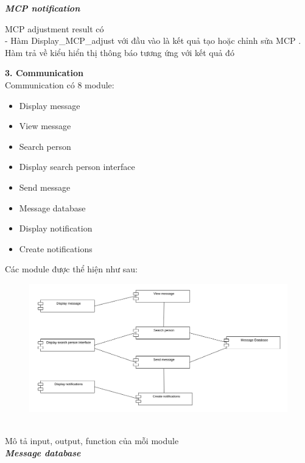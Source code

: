 \documentclass[a4paper]{article}
\begin{document}
\begin{itemize}
\newline
\newline
\textbf{    \textit{MCP notification } } \\
\begin{minipage}[b]{0.4\textwidth}
MCP adjustment result có\\
- Hàm Display\_MCP\_adjust với đầu vào là kết quả tạo hoặc chỉnh sửa MCP . Hàm trả về kiểu hiển thị thông báo tương ứng với kết quả đó
\end{minipage}
\hfill
{}
\newline
\newline
\newline
\newpage
\textbf{    3. Communication } \\
    Communication có 8 module:
    \begin{itemize}
        \item Display message
        \item View message
        \item Search person
        \item Display search person interface
        \item Send message
        \item Message database
        \item Display notification
        \item Create notifications
    \end{itemize}
    Các module được thể hiện như sau:\\
    \begin{figure}[!h]
    \begin{center}
      \includegraphics[width=6in]{Image/com_module.png}
    \end{center}
\end{figure} \\
    Mô tả input, output, function của mỗi module\\
\textbf{    \textit{Message database} }
    

\end{itemize}
\end{document}
